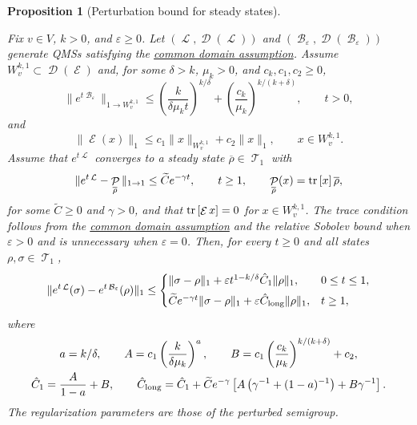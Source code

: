 \documentclass[11pt]{article}
\theoremstyle{myplain}
\newtheorem{prop}[prop]{Proposition}
\theoremstyle{mydefinition}
\theoremstyle{remark}
\DeclareMathOperator{\cB}{\mathcal{B}}
\DeclareMathOperator{\cD}{\mathcal{D}}
\DeclareMathOperator{\cE}{\mathcal{E}}
\DeclareMathOperator{\cL}{\mathcal{L}}
\DeclareMathOperator{\cP}{\mathcal{P}}
\DeclareMathOperator{\cT}{\mathcal{T}}
\DeclareMathOperator{\1}{\mathds{1}}
\newcommand{\tr}[1][]{\operatorname{tr}%
  \ifx#1\empty \else \left[ #1 \right] \fi}
\begin{document}
    \begin{prop}[Perturbation bound for steady states]\label{appx-prop:steady-state-perturbation-bound}
        
        Fix $v \in V$, $k > 0$, and $\varepsilon \ge 0$. Let $(\cL,\cD(\cL))$ and $(\cB_\varepsilon,\cD(\cB_\varepsilon))$ generate QMSs satisfying the \hyperref[assum:perturbation-common-domain]{common domain assumption}. Assume $W_v^{k,1} \subset \cD(\cE)$ and, for some $\delta > k$, $\mu_k > 0$, and $c_k,c_1,c_2 \ge 0$,
        \begin{equation*}
            \|e^{t\cB_\varepsilon}\|_{1\to W_v^{k,1}}
            \le \left(\frac{k}{\delta\mu_k t}\right)^{k/\delta}
            + \left(\frac{c_k}{\mu_k}\right)^{k/(k+\delta)},\qquad t > 0,
        \end{equation*}
        and
        \begin{equation*}
            \|\cE(x)\|_1 \le c_1\|x\|_{W_v^{k,1}} + c_2\|x\|_1,
            \qquad x \in W_v^{k,1}.
        \end{equation*}
        Assume that $e^{t\cL}$ converges to a steady state $\overline\rho \in \cT_1$ with
        \begin{equation*}
            \|e^{t\cL} - \cP_{\overline\rho}\|_{1\to1}
            \le \widetilde C e^{-\gamma t},\qquad t \ge 1,\qquad
            \cP_{\overline\rho}(x) = \tr[x]\overline\rho,
        \end{equation*}
        for some $\widetilde C \ge 0$ and $\gamma > 0$, and that $\tr[\cE x] = 0$ for $x \in W_v^{k,1}$. The trace condition follows from the \hyperref[assum:perturbation-common-domain]{common domain assumption} and the relative Sobolev bound when $\varepsilon > 0$ and is unnecessary when $\varepsilon = 0$. Then, for every $t \ge 0$ and all states $\rho,\sigma \in \cT_1$,
        \begin{equation*}
            \|e^{t\cL}(\sigma) - e^{t\cB_\varepsilon}(\rho)\|_1
            \le
            \begin{cases}
                \|\sigma - \rho\|_1 + \varepsilon t^{1-k/\delta}\hat C_1\|\rho\|_1,&0 \le t \le 1,\\[4pt]
                \widetilde C e^{-\gamma t}\|\sigma - \rho\|_1
                + \varepsilon\hat C_{\rm long}\|\rho\|_1,&t \ge 1,
            \end{cases}
        \end{equation*}
        where
        \begin{equation*}
            \begin{gathered}
                a = k/\delta,\qquad A = c_1\left(\frac{k}{\delta\mu_k}\right)^a,
                \qquad B = c_1\left(\frac{c_k}{\mu_k}\right)^{k/(k+\delta)} + c_2,\\
                \hat C_1 = \frac{A}{1-a} + B,\qquad
                \hat C_{\rm long} = \hat C_1 + \widetilde C e^{-\gamma}
                \left[A\left(\gamma^{-1} + (1-a)^{-1}\right) + B\gamma^{-1}\right].
            \end{gathered}
        \end{equation*}
        The regularization parameters are those of the perturbed semigroup.
        
    \end{prop}
\end{document}
